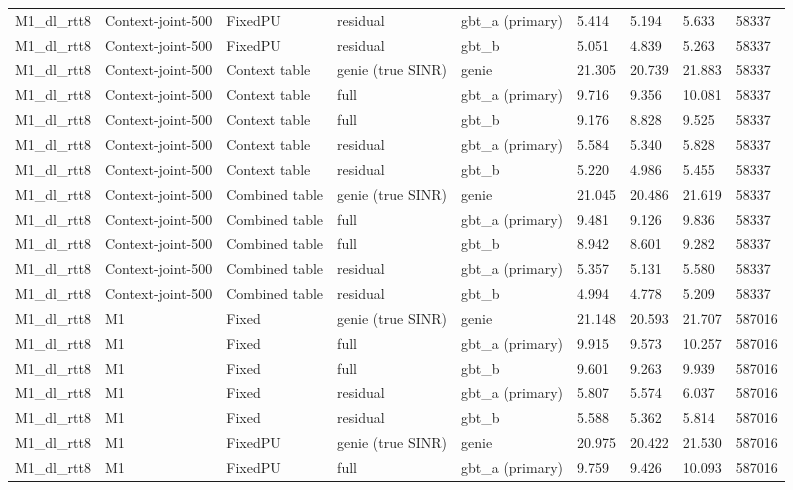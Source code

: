 \documentclass[10pt]{article}
\begin{document}
\begin{landscape}
\begin{longtable}{@{}lllllllll@{}}
M1\_dl\_rtt8 & Context-joint-500 & FixedPU & residual & gbt\_a (primary) & 5.414 & 5.194 & 5.633 & 58337 \\
M1\_dl\_rtt8 & Context-joint-500 & FixedPU & residual & gbt\_b & 5.051 & 4.839 & 5.263 & 58337 \\
M1\_dl\_rtt8 & Context-joint-500 & Context table & genie (true SINR) & genie & 21.305 & 20.739 & 21.883 & 58337 \\
M1\_dl\_rtt8 & Context-joint-500 & Context table & full & gbt\_a (primary) & 9.716 & 9.356 & 10.081 & 58337 \\
M1\_dl\_rtt8 & Context-joint-500 & Context table & full & gbt\_b & 9.176 & 8.828 & 9.525 & 58337 \\
M1\_dl\_rtt8 & Context-joint-500 & Context table & residual & gbt\_a (primary) & 5.584 & 5.340 & 5.828 & 58337 \\
M1\_dl\_rtt8 & Context-joint-500 & Context table & residual & gbt\_b & 5.220 & 4.986 & 5.455 & 58337 \\
M1\_dl\_rtt8 & Context-joint-500 & Combined table & genie (true SINR) & genie & 21.045 & 20.486 & 21.619 & 58337 \\
M1\_dl\_rtt8 & Context-joint-500 & Combined table & full & gbt\_a (primary) & 9.481 & 9.126 & 9.836 & 58337 \\
M1\_dl\_rtt8 & Context-joint-500 & Combined table & full & gbt\_b & 8.942 & 8.601 & 9.282 & 58337 \\
M1\_dl\_rtt8 & Context-joint-500 & Combined table & residual & gbt\_a (primary) & 5.357 & 5.131 & 5.580 & 58337 \\
M1\_dl\_rtt8 & Context-joint-500 & Combined table & residual & gbt\_b & 4.994 & 4.778 & 5.209 & 58337 \\
M1\_dl\_rtt8 & M1 & Fixed & genie (true SINR) & genie & 21.148 & 20.593 & 21.707 & 587016 \\
M1\_dl\_rtt8 & M1 & Fixed & full & gbt\_a (primary) & 9.915 & 9.573 & 10.257 & 587016 \\
M1\_dl\_rtt8 & M1 & Fixed & full & gbt\_b & 9.601 & 9.263 & 9.939 & 587016 \\
M1\_dl\_rtt8 & M1 & Fixed & residual & gbt\_a (primary) & 5.807 & 5.574 & 6.037 & 587016 \\
M1\_dl\_rtt8 & M1 & Fixed & residual & gbt\_b & 5.588 & 5.362 & 5.814 & 587016 \\
M1\_dl\_rtt8 & M1 & FixedPU & genie (true SINR) & genie & 20.975 & 20.422 & 21.530 & 587016 \\
M1\_dl\_rtt8 & M1 & FixedPU & full & gbt\_a (primary) & 9.759 & 9.426 & 10.093 & 587016 \\

\end{longtable}
\end{landscape}
\end{document}
